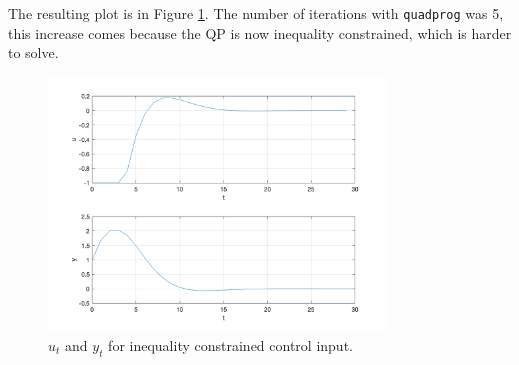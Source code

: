 \documentclass[11pt, a4paper, english]{NTNUoving}
\begin{document}
\begin{oppgave}
\begin{punkt}
    \end{punkt}

    \begin{punkt}
        \label{1f}
        The resulting plot is in Figure \ref{fig:1f}. The number of iterations with \texttt{quadprog} was 5, this increase comes because the QP is
        now inequality constrained, which is harder to solve.
        \begin{figure}[H]
            \centering
            \includegraphics[width=0.8\textwidth]{../1f.png}
            \caption{$u_t$ and $y_t$ for inequality constrained control input.}
            \label{fig:1f}
        \end{figure}
    \end{punkt}

\end{oppgave}
\end{document}
